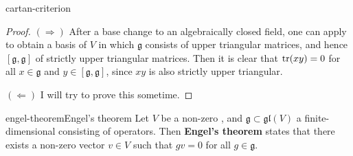 \begin{example}{cartan-criterion}
    \begin{proof}
        $(\Rightarrow)$ After a base change to an algebraically closed field, one can apply  to obtain a basis of $V$ in which $\mathfrak{g}$ consists of upper triangular matrices, and hence $[\mathfrak{g}, \mathfrak{g}]$ of strictly upper triangular matrices. Then it is clear that $\operatorname{tr}(xy) = 0$ for all $x \in \mathfrak{g}$ and $y \in [\mathfrak{g}, \mathfrak{g}]$, since $xy$ is also strictly upper triangular.
        
        $(\Leftarrow)$ I will try to prove this sometime. %
    \end{proof}
\end{example}

\begin{topic}{engel-theorem}{Engel's theorem}
    Let $V$ be a non-zero , and $\mathfrak{g} \subset \mathfrak{gl}(V)$ a finite-dimensional  consisting of  operators. Then \textbf{Engel's theorem} states that there exists a non-zero vector $v \in V$ such that $gv = 0$ for all $g \in \mathfrak{g}$.
\end{topic}

